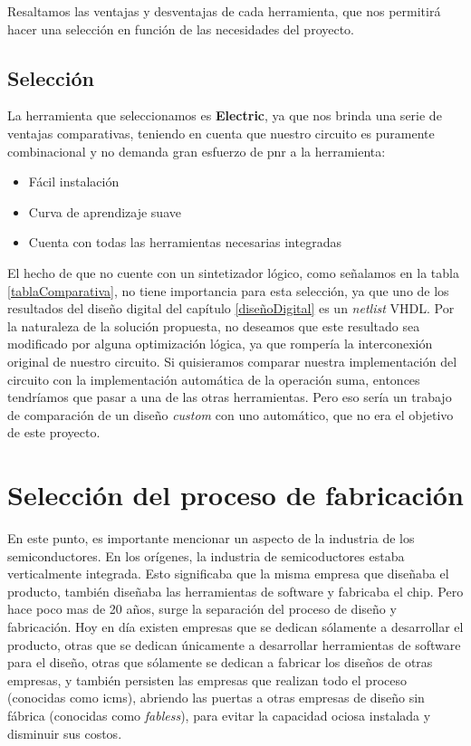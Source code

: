 Resaltamos las ventajas y desventajas de cada herramienta, que nos permitirá hacer una selección en función de las necesidades del proyecto.
\subsection{Selección}
La herramienta que seleccionamos es \textbf{Electric}, ya que nos brinda una serie de ventajas comparativas, teniendo en cuenta que nuestro circuito es puramente combinacional y no demanda gran esfuerzo de \gls{pnr} a la herramienta:
\begin{itemize}
\item Fácil instalación
\item Curva de aprendizaje suave
\item Cuenta con todas las herramientas necesarias integradas
\end{itemize}
El hecho de que no cuente con un sintetizador lógico, como señalamos en la tabla \ref{tablaComparativa}, no tiene importancia para esta selección, ya que uno de los resultados del diseño digital del capítulo \ref{diseñoDigital} es un \emph{netlist} VHDL. Por la naturaleza de la solución propuesta, no deseamos que este resultado sea modificado por alguna optimización lógica, ya que rompería la interconexión original de nuestro circuito. Si quisieramos comparar nuestra implementación del circuito con la implementación automática de la operación suma, entonces tendríamos que pasar a una de las otras herramientas. Pero eso sería un trabajo de comparación de un diseño \emph{custom} con uno automático, que no era el objetivo de este proyecto. 

\section{Selección del proceso de fabricación}\label{procesoFabricación}

En este punto, es importante mencionar un aspecto de la industria de los semiconductores. En los orígenes, la industria de semicoductores estaba verticalmente integrada. Esto significaba que la misma empresa que diseñaba el producto, también diseñaba las herramientas de software y fabricaba el chip. Pero hace poco mas de 20 años, surge la separación del proceso de diseño y fabricación. Hoy en día existen empresas que se dedican sólamente a desarrollar el producto, otras que se dedican únicamente a desarrollar herramientas de software para el diseño, otras que sólamente se dedican a fabricar los diseños de otras empresas, y también persisten las empresas que realizan todo el proceso (conocidas como \gls{icms}), abriendo las puertas a otras empresas de diseño sin fábrica (conocidas como \emph{fabless}), para evitar la capacidad ociosa instalada y disminuir sus costos.
